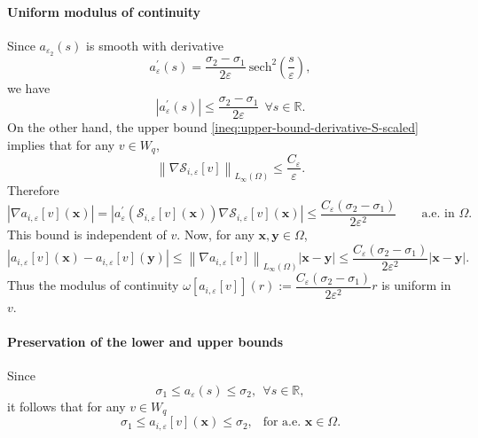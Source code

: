 \documentclass[final,onefignum,onetabnum]{mousaviart}
\newcounter{example}
\begin{document}
\begin{example}
		\paragraph{Uniform modulus of continuity}
		Since $a_{\varepsilon_2}(s)$ is smooth with derivative
		\[
		{a}^{\prime}_{\varepsilon}(s)
		=
		\frac{\sigma_2- \sigma_1}{2 \varepsilon} ~\mathrm{sech}^2(\frac{s}{\varepsilon}),
		\]  
		we have 
		\begin{equation}
			\label{ineq:upper-bound-derivative-a-smooth}
		\left| 
		{a}^{\prime}_{\varepsilon}(s)
		\right| 
		\le
		\frac{\sigma_2- \sigma_1}{2 \varepsilon}
		~~
		\forall s \in \mathbb{R}.
		\end{equation}
		On the other hand, the upper bound \eqref{ineq:upper-bound-derivative-S-scaled} implies that for any $v \in W_q$,
		\begin{equation}
			\label{ineq:upper-bound-gradient-S}
		\left\|  \nabla \mathcal{S}_{i, \varepsilon}[v] \right\|_{L_{\infty}(\Omega)}\le 
		\frac{C_{\varepsilon}}{\varepsilon}.
		\end{equation}
		Therefore
		\begin{equation}
			\label{ineq:upper-bound-smooth-gradient-a}
		\left| \nabla a_{i, \varepsilon}[v](\boldsymbol{x}) \right| 
		= 
		\left| 
		a^{\prime}_{\varepsilon}\left(  
		\mathcal{S}_{i, \varepsilon}[v](\boldsymbol{x})
		\right) 
		\nabla \mathcal{S}_{i, \varepsilon}[v](\boldsymbol{x})
		\right| 
		\le
		\frac{ C_{\varepsilon} \left( \sigma_2 - \sigma_1\right) }{2 \varepsilon^2}
		\qquad
		\text{a.e. in } \Omega.
		\end{equation}
		This bound is independent of $v$. Now, for any $\boldsymbol{x}, \boldsymbol{y} \in \Omega$, 
		\begin{equation}
			\label{ineq:uniform-modulus-of-continuity-scaled}
		\left| 
		a_{i, \varepsilon}[v](\boldsymbol{x})
		-
		a_{i, \varepsilon}[v](\boldsymbol{y})
		\right| 
		\le
		\left\| 
		\nabla a_{i, \varepsilon}[v]
		\right\|_{L_{\infty}(\Omega)}\left| \boldsymbol{x} - \boldsymbol{y} \right| 
		\le
		\frac{C_{\varepsilon}\left( \sigma_2 - \sigma_1\right) }{2 \varepsilon^2} 
		\left| \boldsymbol{x} - \boldsymbol{y} \right| .
		\end{equation}
		Thus the modulus of continuity $\omega[a_{i, \varepsilon}[v]](r):=\dfrac{ C_{\varepsilon} \left( \sigma_2 - \sigma_1\right) }{2 \varepsilon^2} r $ is uniform in $v$.
		\paragraph{Preservation of the lower and upper bounds}
		Since 
		\[
		\sigma_1
		\leq
		a_{\varepsilon}(s)
		\leq
		\sigma_2, 
		~~ \forall s \in \mathbb{R},
		\]
		it follows that for any $v \in W_q$
		\begin{equation}
			\label{ineq:lower-upper-bound-a-regularized}
		\sigma_1 
		\leq
		a_{i, \varepsilon}\left[ v \right] (\boldsymbol{x})
		\leq
		 \sigma_2,
		~~ \text{ for a.e. }
		\boldsymbol{x} \in \Omega.
		\end{equation}	
	\end{example}
\end{document}
